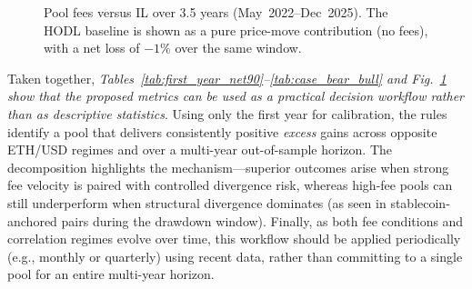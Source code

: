 \documentclass[journal]{IEEEtran}
\begin{document}
\begin{figure}[t]
\centering
{}
\caption{Pool fees versus IL over 3.5 years (May~2022--Dec~2025). The HODL baseline is shown as a pure price-move contribution (no fees), with a net loss of \(-1\%\) over the same window.}
\label{fig:post_contrib}
\end{figure}



Taken together, \noindent\textit{Tables~\ref{tab:first_year_net90}--\ref{tab:case_bear_bull} and Fig.~\ref{fig:post_contrib} show that the proposed metrics can be used as a practical decision workflow rather than as descriptive statistics}. Using only the first year for calibration, the rules identify a pool that delivers consistently positive \emph{excess} gains across opposite ETH/USD regimes and over a multi-year out-of-sample horizon. 
The decomposition highlights the mechanism---superior outcomes arise when strong fee velocity is paired with controlled divergence risk, whereas high-fee pools can still underperform when structural divergence dominates (as seen in stablecoin-anchored pairs during the drawdown window). Finally, as both fee conditions and correlation regimes evolve over time, this workflow should be applied periodically (e.g., monthly or quarterly) using recent data, rather than committing to a single pool for an entire multi-year horizon.
\end{document}
